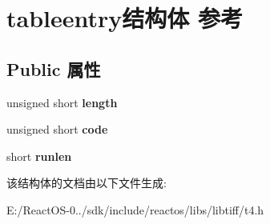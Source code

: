 \hypertarget{structtableentry}{}\section{tableentry结构体 参考}
\label{structtableentry}
\subsection*{Public 属性}
\begin{DoxyCompactItemize}
\item 
\mbox{\label{structtableentry_a724fb9c7c4c80bc62f510843cbf03e58}} 
unsigned short {\bfseries length}
\item 
\mbox{\label{structtableentry_a2dbebf7bb10adfe36c7f082b21adc56e}} 
unsigned short {\bfseries code}
\item 
\mbox{\label{structtableentry_a99238f40b1050e542fd53feca68e1e99}} 
short {\bfseries runlen}
\end{DoxyCompactItemize}


该结构体的文档由以下文件生成\+:\begin{DoxyCompactItemize}
\item 
E\+:/\+React\+O\+S-\/0../sdk/include/reactos/libs/libtiff/t4.\+h\end{DoxyCompactItemize}
